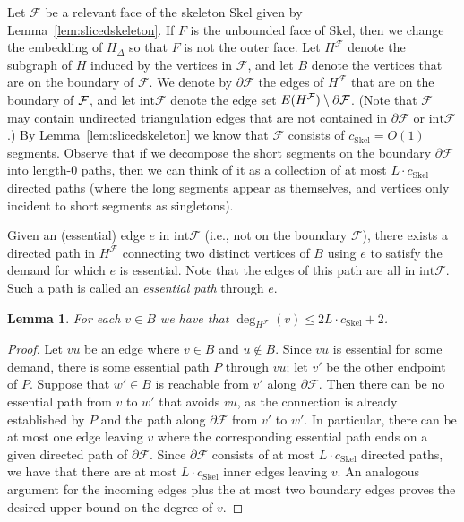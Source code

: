 \documentclass[a4paper,11pt]{article}
\newcommand{\bd}{\partial}
\newcommand{\inter}{\mathrm{int}}
\newcommand{\calF}{\mathcal{F}}
\newcommand{\Skel}{\mathrm{Skel}}
\theoremstyle{plain}
\newtheorem{lemma}[theorem]{Lemma}
\newtheorem{identification rule}{Identification Rule}
\theoremstyle{definition}
\theoremstyle{remark}
\begin{document}
Let $\calF$ be a relevant face of the skeleton $\Skel$ given by Lemma~\ref{lem:slicedskeleton}. If $F$ is the unbounded face of $\Skel$, then we change the embedding of $H_\Delta$ so that $F$ is not the outer face. Let $H^\calF$ denote the subgraph of $H$ induced by the vertices in $\calF$, and let $B$ denote the vertices that are on the boundary of $\calF$. We denote by $\bd \calF$ the edges of $H^\calF$ that are on the boundary of $\cal F$, and let $\inter \calF$ denote the edge set $E(H^\calF) \setminus \bd \cal F$. (Note that $\calF$ may contain undirected triangulation edges that are not contained in $\bd \calF$ or $\inter \calF$.) By Lemma~\ref{lem:slicedskeleton} we know that $\calF$ consists of $c_\Skel=O(1)$ segments. Observe that if we decompose the short segments on the boundary $\bd\calF$ into length-$0$ paths, then we can think of it as a collection of at most $L\cdot c_\Skel$ directed paths (where the long segments appear as themselves, and vertices only incident to short segments as singletons).

Given an (essential) edge $e$ in $\inter \calF$ (i.e., not on the boundary $\calF$), there exists a directed path in $H^\calF$ connecting two distinct vertices of $B$ using $e$ to satisfy the demand for which $e$ is essential. Note that the edges of this path are all in $\inter\calF$. Such a path is called an \emph{essential path} through $e$.

\begin{lemma}\label{lem:boundary_degree}
For each $v\in B$ we have that $\deg_{H^\calF}(v)\leq 2L\cdot c_\Skel+2$.
\end{lemma}

\begin{proof}
Let $vu$ be an edge where $v\in B$ and $u\not \in B$. Since $vu$ is essential for some demand, there is some essential path $P$ through $vu$; let $v'$ be the other endpoint of $P$. Suppose that $w'\in B$ is reachable from $v'$ along $\bd \calF$. Then there can be no essential path from $v$ to $w'$ that avoids $vu$, as the connection is already established by $P$ and the path along $\bd \calF$ from $v'$ to $w'$. In particular, there can be at most one edge leaving $v$ where the corresponding essential path ends on a given directed path of $\bd\calF$. Since $\bd\calF$ consists of at most $L\cdot c_\Skel$ directed paths, we have that there are at most $L\cdot c_\Skel$ inner edges leaving $v$. An analogous argument for the incoming edges plus the at most two boundary edges proves the desired upper bound on the degree of $v$.
\end{proof}
\end{document}
